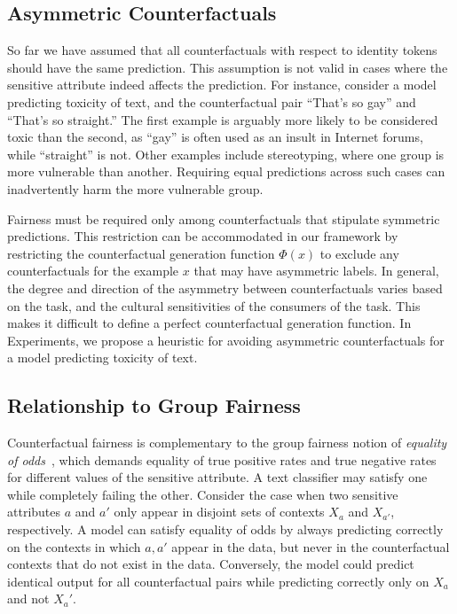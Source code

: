 \documentclass[letterpaper]{article} %
\theoremstyle{definition}
\begin{document}
\subsection{Asymmetric Counterfactuals}

So far we have assumed that all counterfactuals with respect to identity tokens should have the same prediction. This assumption is not valid in cases where the sensitive attribute indeed affects the prediction. 
For instance, consider a model predicting toxicity of text, and the counterfactual pair ``That's so gay'' and ``That's so straight.'' The first example is arguably more likely to be considered toxic than the second, as ``gay'' is often used as an insult in Internet forums, while ``straight'' is not. Other examples include stereotyping, where one group is more vulnerable than another. Requiring equal predictions across such cases can inadvertently harm the more vulnerable group.


Fairness must be required only among counterfactuals that stipulate symmetric predictions. This restriction can be accommodated in our framework by restricting the counterfactual generation function $\Phi(x)$ to exclude any counterfactuals for the example $x$ that may have asymmetric labels. In general, the degree and direction of the asymmetry between counterfactuals varies based on the task, and the cultural sensitivities of the consumers of the task. This makes it difficult to define a perfect counterfactual generation function. In Experiments, we propose a 
heuristic for avoiding asymmetric counterfactuals for a model predicting toxicity of text.


\subsection{Relationship to Group Fairness}\label{relationship}
Counterfactual fairness is complementary to the group fairness notion of \emph{equality of odds}~\cite{Hardt16}, which demands equality of true positive rates and true negative rates for different values of the sensitive attribute. A text classifier may satisfy one while completely failing the other.
Consider the case when two sensitive attributes $a$ and $a'$ only appear in disjoint sets of contexts $X_a$ and $X_{a'}$, respectively. A model can satisfy equality of odds by always predicting correctly on the contexts in which $a, a'$ appear in the data, but never in the counterfactual contexts that do not exist in the data. Conversely, the model could predict identical output for all counterfactual pairs while predicting correctly only on $X_a$ and not $X_a'$.
\end{document}
